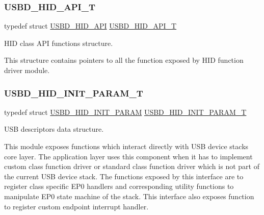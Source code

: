 \subsubsection{\texorpdfstring{U\+S\+B\+D\+\_\+\+H\+I\+D\+\_\+\+A\+P\+I\+\_\+T}{USBD\_HID\_API\_T}}
{\footnotesize\ttfamily typedef struct \hyperlink{struct_u_s_b_d___h_i_d___a_p_i}{U\+S\+B\+D\+\_\+\+H\+I\+D\+\_\+\+A\+PI}  \hyperlink{group___u_s_b_d___h_i_d_ga48d7b7f66a852d99dfbe2c419cc408ba}{U\+S\+B\+D\+\_\+\+H\+I\+D\+\_\+\+A\+P\+I\+\_\+T}}



H\+ID class A\+PI functions structure.

This structure contains pointers to all the function exposed by H\+ID function driver module. 

\mbox{\label{group___u_s_b_d___h_i_d_ga192251fa5ec461eaa9a77b76dbe7c3fa}} 
\subsubsection{\texorpdfstring{U\+S\+B\+D\+\_\+\+H\+I\+D\+\_\+\+I\+N\+I\+T\+\_\+\+P\+A\+R\+A\+M\+\_\+T}{USBD\_HID\_INIT\_PARAM\_T}}
{\footnotesize\ttfamily typedef struct \hyperlink{struct_u_s_b_d___h_i_d___i_n_i_t___p_a_r_a_m}{U\+S\+B\+D\+\_\+\+H\+I\+D\+\_\+\+I\+N\+I\+T\+\_\+\+P\+A\+R\+AM}  \hyperlink{group___u_s_b_d___h_i_d_ga192251fa5ec461eaa9a77b76dbe7c3fa}{U\+S\+B\+D\+\_\+\+H\+I\+D\+\_\+\+I\+N\+I\+T\+\_\+\+P\+A\+R\+A\+M\+\_\+T}}



U\+SB descriptors data structure. 

This module exposes functions which interact directly with U\+SB device stack\textquotesingle{}s core layer. The application layer uses this component when it has to implement custom class function driver or standard class function driver which is not part of the current U\+SB device stack. The functions exposed by this interface are to register class specific E\+P0 handlers and corresponding utility functions to manipulate E\+P0 state machine of the stack. This interface also exposes function to register custom endpoint interrupt handler. 